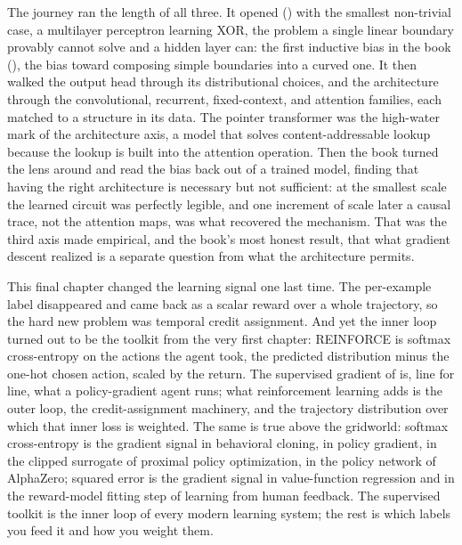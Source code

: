 The journey ran the length of all three. It opened () with
the smallest non-trivial case, a multilayer perceptron learning XOR, the
problem a single linear boundary provably cannot solve and a hidden layer can:
the first inductive bias in the book (), the bias
toward composing simple boundaries into a curved one. It then walked the output
head through its distributional choices, and the architecture through the
convolutional, recurrent, fixed-context, and attention families, each matched
to a structure in its data. The pointer transformer was the high-water mark of
the architecture axis, a model that solves content-addressable lookup because
the lookup is built into the attention operation. Then the book turned the lens
around and read the bias back out of a trained model, finding that having the
right architecture is necessary but not sufficient: at the smallest scale the
learned circuit was perfectly legible, and one increment of scale later a
causal trace, not the attention maps, was what recovered the mechanism. That
was the third axis made empirical, and the book's most honest result, that what
gradient descent realized is a separate question from what the architecture
permits.

This final chapter changed the learning signal one last time. The per-example
label disappeared and came back as a scalar reward over a whole trajectory, so
the hard new problem was temporal credit assignment. And yet the inner loop
turned out to be the toolkit from the very first chapter: REINFORCE is softmax
cross-entropy on the actions the agent took, the predicted distribution minus
the one-hot chosen action, scaled by the return. The supervised gradient of
 is, line for line, what a policy-gradient agent runs;
what reinforcement learning adds is the outer loop, the credit-assignment
machinery, and the trajectory distribution over which that inner loss is
weighted. The same is true above the gridworld: softmax cross-entropy is the
gradient signal in behavioral cloning, in policy gradient, in the clipped
surrogate of proximal policy optimization, in the policy network of AlphaZero;
squared error is the gradient signal in value-function regression and in the
reward-model fitting step of learning from human feedback. The supervised
toolkit is the inner loop of every modern learning system; the rest is which
labels you feed it and how you weight them.

